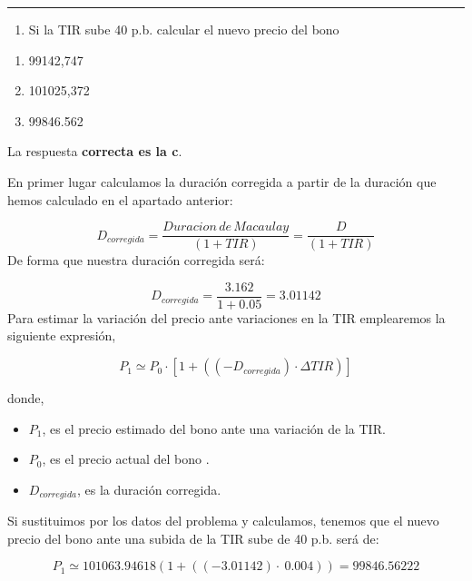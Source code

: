 \documentclass[
  letterpaper,
  DIV=11,
  numbers=noendperiod]{scrartcl}
\providecommand{\tightlist}{%
  \setlength{\itemsep}{0pt}\setlength{\parskip}{0pt}}\usepackage{longtable,booktabs,array}
\begin{document}
\begin{center}\rule{0.5\linewidth}{0.5pt}\end{center}

\begin{enumerate}
\def\labelenumi{\arabic{enumi}.}
\setcounter{enumi}{2}
\tightlist
\item
  Si la TIR sube 40 p.b. calcular el nuevo precio del bono
\end{enumerate}

\begin{enumerate}
\def\labelenumi{\alph{enumi}.}
\item
  99142,747
\item
  101025,372
\item
  99846.562
\end{enumerate}

\begin{tcolorbox}[enhanced jigsaw, colframe=quarto-callout-tip-color-frame, opacityback=0, opacitybacktitle=0.6, colback=white, leftrule=.75mm, bottomtitle=1mm, colbacktitle=quarto-callout-tip-color!10!white, coltitle=black, toprule=.15mm, left=2mm, breakable, toptitle=1mm, titlerule=0mm, title=\textcolor{quarto-callout-tip-color}{\faLightbulb}\hspace{0.5em}{Solución}, arc=.35mm, rightrule=.15mm, bottomrule=.15mm]

La respuesta \textbf{correcta es la c}.

En primer lugar calculamos la duración corregida a partir de la duración
que hemos calculado en el apartado anterior:

\[D_{corregida}=\frac{Duracion\,de\, Macaulay}{\left(1+TIR\right)}=\frac{D}{\left(1+TIR\right)} \]
De forma que nuestra duración corregida será:

\[D_{corregida}=\frac{3.162}{1+0.05}=3.01142\] Para estimar la variación
del precio ante variaciones en la TIR emplearemos la siguiente
expresión,

\[P_1\simeq P_0\cdot\left[1+((-D_{corregida})\cdot\Delta TIR)\right]\]

donde,

\begin{itemize}
\item
  \(P_1\), es el precio estimado del bono ante una variación de la TIR.
\item
  \(P_0\), es el precio actual del bono .
\item
  \(D_{corregida}\), es la duración corregida.
\end{itemize}

Si sustituimos por los datos del problema y calculamos, tenemos que el
nuevo precio del bono ante una subida de la TIR sube de 40 p.b. será de:

\[P_1\simeq 101063.94618\left(1+\left(\left(-3.01142\right)\cdot \:0.004\right)\right)=99846.56222\]

\end{tcolorbox}
\end{document}
